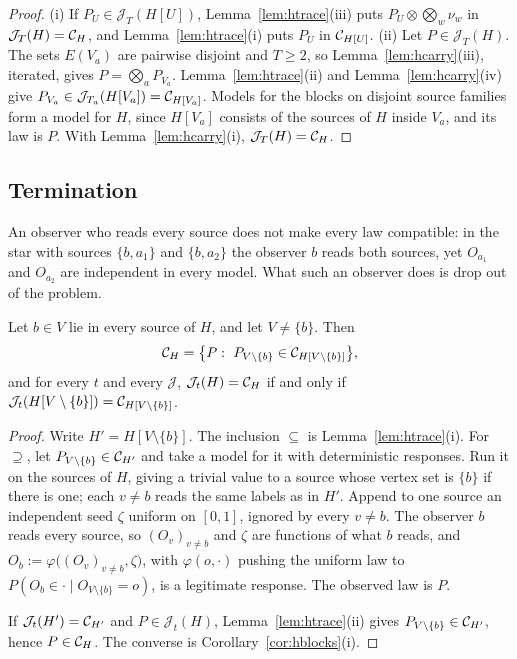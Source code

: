\begin{proof}
(i) If $P_U\in\mathcal J_T(H[U])$, Lemma~\ref{lem:htrace}(iii) puts $P_U\otimes\bigotimes_w\nu_w$ in $\mathcal J_T(H)=\mathcal C_{H}$, and Lemma~\ref{lem:htrace}(i) puts $P_U$ in $\mathcal C_{H[U]}$. (ii) Let $P\in\mathcal J_T(H)$. The sets $E(V_a)$ are pairwise disjoint and $T\ge2$, so Lemma~\ref{lem:hcarry}(iii), iterated, gives $P=\bigotimes_aP_{V_a}$. Lemma~\ref{lem:htrace}(ii) and Lemma~\ref{lem:hcarry}(iv) give $P_{V_a}\in\mathcal J_{T_a}(H[V_a])=\mathcal C_{H[V_a]}$. Models for the blocks on disjoint source families form a model for $H$, since $H[V_a]$ consists of the sources of $H$ inside $V_a$, and its law is $P$. With Lemma~\ref{lem:hcarry}(i), $\mathcal J_T(H)=\mathcal C_{H}$.
\end{proof}

\subsection{Termination}

An observer who reads every source does not make every law compatible: in the star with sources $\{b,a_1\}$ and $\{b,a_2\}$ the observer $b$ reads both sources, yet $O_{a_1}$ and $O_{a_2}$ are independent in every model. What such an observer does is drop out of the problem.

\begin{theorem}\label{thm:hdominating}
Let $b\in V$ lie in every source of $H$, and let $V\ne\{b\}$. Then
\[
\Cscen{H}=\bigl\{P:\ P_{V\setminus\{b\}}\in\Cscen{H[V\setminus\{b\}]}\bigr\},
\]
and for every $t$ and every $\mathcal J$, $\mathcal J_t(H)=\mathcal C_{H}$ if and only if $\mathcal J_t(H[V\setminus\{b\}])=\mathcal C_{H[V\setminus\{b\}]}$.
\end{theorem}

\begin{proof}
Write $H'=H[V\setminus\{b\}]$. The inclusion $\subseteq$ is Lemma~\ref{lem:htrace}(i). For $\supseteq$, let $P_{V\setminus\{b\}}\in\mathcal C_{H'}$ and take a model for it with deterministic responses. Run it on the sources of $H$, giving a trivial value to a source whose vertex set is $\{b\}$ if there is one; each $v\ne b$ reads the same labels as in $H'$. Append to one source an independent seed $\zeta$ uniform on $[0,1]$, ignored by every $v\ne b$. The observer $b$ reads every source, so $(O_v)_{v\ne b}$ and $\zeta$ are functions of what $b$ reads, and $O_b:=\varphi\bigl((O_v)_{v\ne b},\zeta\bigr)$, with $\varphi(o,\cdot)$ pushing the uniform law to $P(O_b\in\cdot\mid O_{V\setminus\{b\}}=o)$, is a legitimate response. The observed law is $P$.

If $\mathcal J_t(H')=\mathcal C_{H'}$ and $P\in\mathcal J_t(H)$, Lemma~\ref{lem:htrace}(ii) gives $P_{V\setminus\{b\}}\in\mathcal C_{H'}$, hence $P\in\mathcal C_{H}$. The converse is Corollary~\ref{cor:hblocks}(i).
\end{proof}

